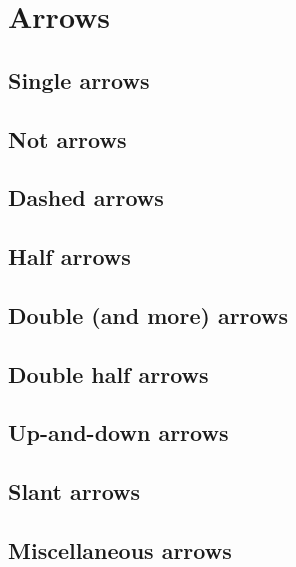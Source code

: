 \documentclass{firamath-test}
\begin{document}
\section{Arrows}

\subsection{Single arrows}

\subsection{Not arrows}

\subsection{Dashed arrows}

\subsection{Half arrows}

\subsection{Double (and more) arrows}

\subsection{Double half arrows}

\subsection{Up-and-down arrows}

\subsection{Slant arrows}

\subsection{Miscellaneous arrows}
\end{document}
